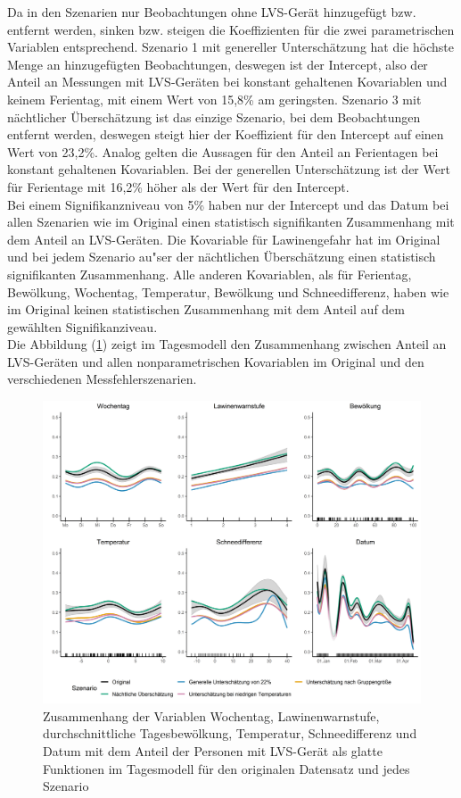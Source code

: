 \documentclass[12pt]{scrreprt}
\begin{document}
\noindent Da in den Szenarien nur Beobachtungen ohne LVS-Gerät hinzugefügt bzw. entfernt werden, sinken bzw. steigen die Koeffizienten für die zwei parametrischen Variablen entsprechend. Szenario 1 mit genereller Unterschätzung hat die höchste Menge an hinzugefügten Beobachtungen, deswegen ist der Intercept, also der Anteil an Messungen mit LVS-Geräten bei konstant gehaltenen Kovariablen und keinem Ferientag, mit einem Wert von 15,8\% am geringsten. Szenario 3 mit nächtlicher Überschätzung ist das einzige Szenario, bei dem Beobachtungen entfernt werden, deswegen steigt hier der Koeffizient für den Intercept auf einen Wert von 23,2\%. Analog gelten die Aussagen für den Anteil an Ferientagen bei konstant gehaltenen Kovariablen. Bei der generellen Unterschätzung ist der Wert für Ferientage mit 16,2\% höher als der Wert für den Intercept.\\
Bei einem Signifikanzniveau von 5\% haben nur der Intercept und das Datum bei allen Szenarien wie im Original einen statistisch signifikanten Zusammenhang mit dem Anteil an LVS-Geräten. Die Kovariable für Lawinengefahr hat im Original und bei jedem Szenario au"ser der nächtlichen Überschätzung einen statistisch signifikanten Zusammenhang. Alle anderen Kovariablen, als für Ferientag, Bewölkung, Wochentag, Temperatur, Bewölkung und Schneedifferenz, haben wie im Original keinen statistischen Zusammenhang mit dem Anteil auf dem gewählten Signifikanziveau. \\
Die Abbildung (\ref{pic:day_model_comparison_plots}) zeigt im Tagesmodell den Zusammenhang zwischen Anteil an LVS-Geräten und allen nonparametrischen Kovariablen im Original und den verschiedenen Messfehlerszenarien.
\begin{figure}[H]
	\centering
	\includegraphics[width=\linewidth]{plots/day_model_comparison_plots}
	\caption{Zusammenhang der Variablen Wochentag, Lawinenwarnstufe, durchschnittliche Tagesbewölkung, Temperatur, Schneedifferenz und Datum mit dem Anteil der Personen mit LVS-Gerät als glatte Funktionen im Tagesmodell für den originalen Datensatz und jedes Szenario}
	\label{pic:day_model_comparison_plots}	
\end{figure}
\end{document}
